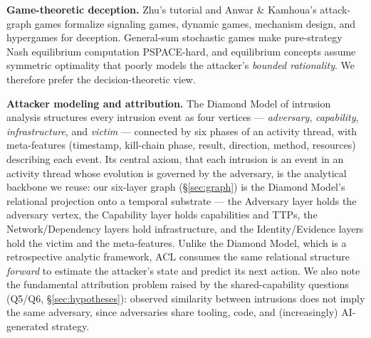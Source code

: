\documentclass[11pt]{article}
\begin{document}
\textbf{Game-theoretic deception.} Zhu's tutorial \cite{zhu} and Anwar \&
Kamhoua's attack-graph games \cite{anwar-kamhoua} formalize signaling games,
dynamic games, mechanism design, and hypergames for deception. General-sum
stochastic games make pure-strategy Nash equilibrium computation
PSPACE-hard, and equilibrium concepts assume symmetric optimality that
poorly models the attacker's \textit{bounded rationality}. We therefore
prefer the decision-theoretic view.

\textbf{Attacker modeling and attribution.} The Diamond Model of intrusion
analysis \cite{diamond} structures every intrusion event as four vertices
--- \textit{adversary}, \textit{capability}, \textit{infrastructure}, and
\textit{victim} --- connected by six phases of an activity thread, with
meta-features (timestamp, kill-chain phase, result, direction, method,
resources) describing each event. Its central axiom, that each intrusion is
an event in an activity thread whose evolution is governed by the adversary,
is the analytical backbone we reuse: our six-layer graph
(\S\ref{sec:graph}) is the Diamond Model's relational projection onto a
temporal substrate --- the Adversary layer holds the adversary vertex, the
Capability layer holds capabilities and TTPs, the Network/Dependency layers
hold infrastructure, and the Identity/Evidence layers hold the victim and
the meta-features. Unlike the Diamond Model, which is a retrospective
analytic framework, ACL consumes the same relational structure
\textit{forward} to estimate the attacker's state and predict its next
action. We also note the fundamental attribution problem raised by the
shared-capability questions (Q5/Q6, \S\ref{sec:hypotheses}): observed
similarity between intrusions does not imply the same adversary, since
adversaries share tooling, code, and (increasingly) AI-generated strategy.
\end{document}
